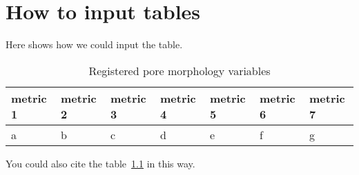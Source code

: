 \chapter{How to input tables}\label{ch:ch3}

Here shows how we could input the table.

\begin{table}[h!]
\caption{Registered pore morphology variables}
\centering
\begin{tabular}{|m{2cm}|m{2cm}|m{2cm}|m{2cm}|m{2cm}|m{2cm}|m{2cm}|} 
\hline
metric 1 & metric 2 & metric 3& metric 4 & metric 5 & metric 6 & metric 7\\
\hline
a & b&	c&d&e&f&g\\
\hline
\end{tabular}
\label{tb:3-1}
\end{table}

You could also cite the table~\ref{tb:3-1} in this way.